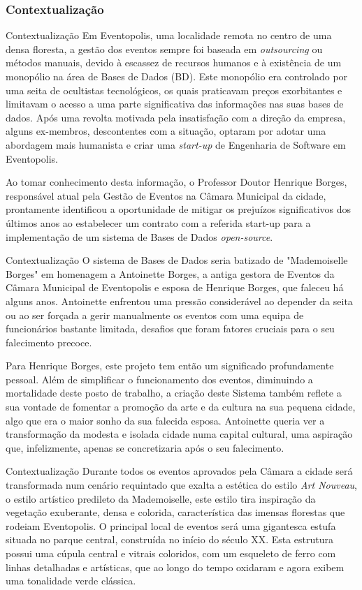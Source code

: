 \documentclass[compress,svgnames,handout,13.7pt]{beamer}
\begin{document}
\subsubsection{Contextualização}
\begin{frame}{Contextualização}
Em Eventopolis, uma localidade remota no centro de uma densa floresta, a gestão dos eventos sempre foi baseada em \textit{outsourcing} ou métodos manuais, devido à escassez de recursos humanos e à existência de um monopólio na área de Bases de Dados (BD). Este monopólio era controlado por uma seita de ocultistas tecnológicos, os quais praticavam preços exorbitantes e limitavam o acesso a uma parte significativa das informações nas suas bases de dados. Após uma revolta motivada pela insatisfação com a direção da empresa, alguns ex-membros, descontentes com a situação, optaram por adotar uma abordagem mais humanista e criar uma \textit{start-up} de Engenharia de Software em Eventopolis.
    
    Ao tomar conhecimento desta informação, o Professor Doutor Henrique Borges, responsável atual pela Gestão de Eventos na Câmara Municipal da cidade, prontamente identificou a oportunidade de mitigar os prejuízos significativos dos últimos anos ao estabelecer um contrato com a referida start-up para a implementação de um sistema de Bases de Dados \textit{open-source}.
\end{frame}
\begin{frame}{Contextualização}
 O sistema de Bases de Dados seria batizado de "Mademoiselle Borges" em homenagem a Antoinette Borges, a antiga gestora de Eventos da Câmara Municipal de Eventopolis e esposa de Henrique Borges, que faleceu há alguns anos. Antoinette enfrentou uma pressão considerável ao depender da seita ou ao ser forçada a gerir manualmente os eventos com uma equipa de funcionários bastante limitada, desafios que foram fatores cruciais para o seu falecimento precoce.
   
Para Henrique Borges, este projeto tem então um significado profundamente pessoal. Além de simplificar o funcionamento dos eventos, diminuindo a mortalidade deste posto de trabalho, a criação deste Sistema também reflete a sua vontade de fomentar a promoção da arte e da cultura na sua pequena cidade, algo que era o maior sonho da sua falecida esposa. Antoinette queria ver a transformação da modesta e isolada cidade numa capital cultural, uma aspiração que, infelizmente, apenas se concretizaria após o seu falecimento.
\end{frame}
\begin{frame}{Contextualização}
Durante todos os eventos aprovados pela Câmara a cidade será transformada num cenário requintado que exalta a estética do estilo \textit{Art Nouveau}, o estilo artístico predileto da Mademoiselle, este estilo tira inspiração da vegetação exuberante, densa e colorida, característica das imensas florestas que rodeiam Eventopolis. O principal local de eventos será uma gigantesca estufa situada no parque central, construída no início do século XX. Esta estrutura possui uma cúpula central e vitrais coloridos, com um esqueleto de ferro com linhas detalhadas e artísticas, que ao longo do tempo oxidaram e agora exibem uma tonalidade verde clássica.
\end{frame}
\end{document}

